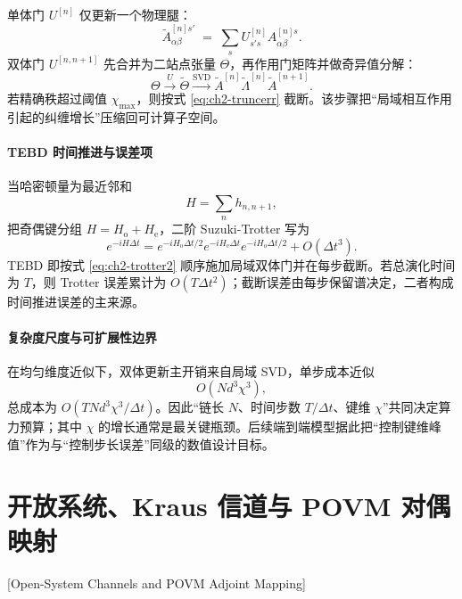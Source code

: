 单体门 $U^{[n]}$ 仅更新一个物理腿：
\begin{equation}
\tilde A^{[n]s'}_{\alpha\beta}
\;=\;
\sum_{s}U^{[n]}_{s's}A^{[n]s}_{\alpha\beta}.
\end{equation}
双体门 $U^{[n,n+1]}$ 先合并为二站点张量 $\Theta$，再作用门矩阵并做奇异值分解：
\begin{equation}
\Theta \xrightarrow{\,U\,}\tilde\Theta
\xrightarrow{\mathrm{SVD}}
\tilde A^{[n]}\tilde\Lambda^{[n]}\tilde A^{[n+1]}.
\label{eq:ch2-two-site-update}
\end{equation}
若精确秩超过阈值 $\chi_{\max}$，则按式 \eqref{eq:ch2-truncerr} 截断。该步骤把“局域相互作用引起的纠缠增长”压缩回可计算子空间。

\paragraph{TEBD 时间推进与误差项}

当哈密顿量为最近邻和
\begin{equation}
H=\sum_{n}h_{n,n+1},
\end{equation}
把奇偶键分组 $H=H_{\mathrm{o}}+H_{\mathrm{e}}$，二阶 Suzuki-Trotter 写为
\begin{equation}
e^{-iH\Delta t}
=
e^{-iH_{\mathrm{o}}\Delta t/2}
e^{-iH_{\mathrm{e}}\Delta t}
e^{-iH_{\mathrm{o}}\Delta t/2}
 + O(\Delta t^3).
\label{eq:ch2-trotter2}
\end{equation}
TEBD 即按式 \eqref{eq:ch2-trotter2} 顺序施加局域双体门并在每步截断。若总演化时间为 $T$，则 Trotter 误差累计为 $O(T\Delta t^2)$；截断误差由每步保留谱决定，二者构成时间推进误差的主来源。

\paragraph{复杂度尺度与可扩展性边界}

在均匀维度近似下，双体更新主开销来自局域 SVD，单步成本近似
\begin{equation}
O(Nd^3\chi^3),
\end{equation}
总成本为 $O\!\left(TN d^3\chi^3/\Delta t\right)$。因此“链长 $N$、时间步数 $T/\Delta t$、键维 $\chi$”共同决定算力预算；其中 $\chi$ 的增长通常是最关键瓶颈。后续端到端模型据此把“控制键维峰值”作为与“控制步长误差”同级的数值设计目标。

\section{开放系统、Kraus 信道与 POVM 对偶映射}[Open-System Channels and POVM Adjoint Mapping]

